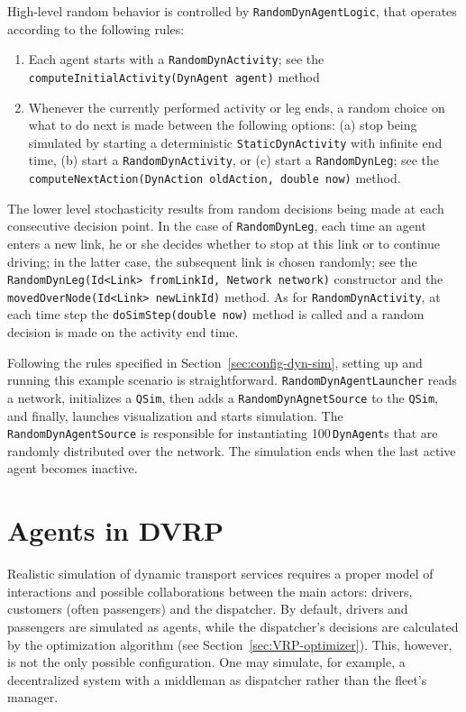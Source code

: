 High-level random behavior is controlled by \lstinline$RandomDynAgentLogic$, that operates according to the following rules:
%
\begin{enumerate}

	\item Each agent starts with a \lstinline$RandomDynActivity$; see the \lstinline$computeInitialActivity(DynAgent agent)$ method
	
	\item Whenever the currently performed activity or leg ends, a random choice on what to do next is made between the following options: (a) stop being simulated by starting a deterministic \lstinline$StaticDynActivity$ with infinite end time, (b) start a \lstinline$RandomDynActivity$, or (c) start a \lstinline$RandomDynLeg$; see the \lstinline$computeNextAction(DynAction oldAction, double now)$ method.

\end{enumerate}

The lower level stochasticity results from random decisions being made at each consecutive decision point. In the case of \lstinline$RandomDynLeg$, each time an agent enters a new link, he or she decides whether to stop at this link or to continue driving; in the latter case, the subsequent link is chosen randomly; see the \lstinline$RandomDynLeg(Id<Link> fromLinkId, Network network)$ constructor and the \lstinline$movedOverNode(Id<Link> newLinkId)$ method. As for \lstinline$RandomDynActivity$, at each time step the \lstinline$doSimStep(double now)$ method is called and a random decision is made on the activity end time.

Following the rules specified in Section~\ref{sec:config-dyn-sim}, setting up and running this example scenario is straightforward. \lstinline$RandomDynAgentLauncher$ reads a network, initializes a \lstinline$QSim$, then adds a \lstinline$RandomDynAgnetSource$ to the \lstinline$QSim$, and finally, launches visualization and starts simulation. The \lstinline$RandomDynAgentSource$ is responsible for instantiating 100\,\lstinline$DynAgent$s that are randomly distributed over the network. The simulation ends when the last active agent becomes inactive.

\section{Agents in DVRP}
Realistic simulation of dynamic transport services requires a proper model of interactions and possible collaborations between the main actors: drivers, customers (often passengers) and the dispatcher. By default, drivers and passengers are simulated as agents, while the dispatcher's decisions are calculated by the optimization algorithm (see Section~\ref{sec:VRP-optimizer}). This, however, is not the only possible configuration. One may simulate, for example, a decentralized system with  a middleman as dispatcher rather than the fleet's manager.

